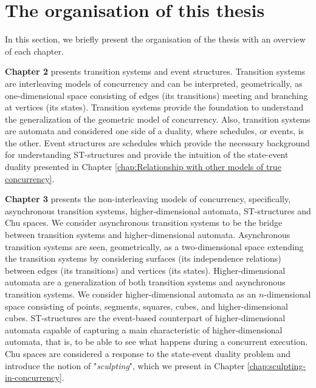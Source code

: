 \section{The organisation of this thesis}
In this section, we briefly present the organisation of the thesis with an overview of each chapter.

\textbf{Chapter 2} presents transition systems and event structures. Transition systems are interleaving models of concurrency and can be interpreted, geometrically, as one-dimensional space consisting of edges (its transitions) meeting and branching at vertices (its states). Transition systems provide the foundation to understand the generalization of the geometric model of concurrency. Also, transition systems are automata and considered one side of a duality, where schedules, or events, is the other. Event structures are schedules which provide the necessary background for understanding ST-structures and provide the intuition of the state-event duality presented in Chapter \ref{chap:Relationship with other models of true concurrency}. 



\textbf{Chapter 3} presents the non-interleaving models of concurrency, specifically, asynchronous transition systems, higher-dimensional automata, ST-structures and Chu spaces. We consider asynchronous transition systems to be the bridge between transition systems and higher-dimensional automata. Asynchronous transition systems are seen, geometrically, as a two-dimensional space extending the transition systems by considering surfaces (its independence relations) between edges (its transitions) and vertices (its states). Higher-dimensional automata are a generalization of both transition systems and asynchronous transition systems. We consider higher-dimensional automata as an $n$-dimensional space consisting of points, segments, squares, cubes, and higher-dimensional cubes. ST-structures are the event-based counterpart of higher-dimensional automata capable of capturing a main characteristic of higher-dimensional automata, that is, to be able to see what happens during a concurrent execution. Chu spaces are considered a response to the state-event duality problem and introduce the notion of "\emph{sculpting}", which we present in Chapter \ref{chap:sculpting-in-concurrency}.

